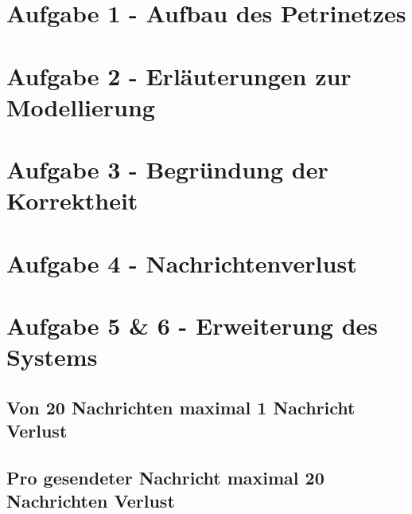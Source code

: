 \documentclass[10pt]{scrartcl}
\author{Carsten Noetzel, Armin Steudte}
\title{\titletext}
\date{23.03.2012}
\begin{document}
\maketitle

\setcounter{tocdepth}{3}
\tableofcontents
\listoffigures

\section{Aufgabe 1 - Aufbau des Petrinetzes}

\section{Aufgabe 2 - Erläuterungen zur Modellierung}

\section{Aufgabe 3 - Begründung der Korrektheit}

\section{Aufgabe 4 - Nachrichtenverlust}

\section{Aufgabe 5 \& 6 - Erweiterung des Systems}
\subsection{Von 20 Nachrichten maximal 1 Nachricht Verlust}
\subsection{Pro gesendeter Nachricht maximal 20 Nachrichten Verlust}
\end{document}

